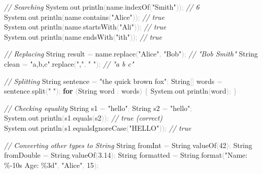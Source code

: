 \documentclass[
  justified,
  openright,
]{tufte-book}
\newcommand{\KeywordTok}[1]{\textcolor{CodeKeyword}{\textbf{#1}}}  %
\newcommand{\StringTok}[1]{\textcolor{CodeString}{#1}}              %
\newcommand{\CommentTok}[1]{\textcolor{CodeComment}{\textit{#1}}}  %
\newcommand{\CodeNumTok}[1]{\textcolor{CodeNumber}{#1}}             %
\newcommand{\CodeFuncTok}[1]{\textcolor{CodeKeyword}{#1}}           %
\newcommand{\OperatorTok}[1]{\textcolor{DarkGray}{#1}}              %
\newenvironment{Shaded}{%
  \begin{mdframed}[style=TufteCode]%
}{%
  \end{mdframed}%
}
\begin{document}
\begin{Shaded}
\begin{Highlighting}[]
\CommentTok{// Searching}
System\OperatorTok{.}\CodeFuncTok{out}\OperatorTok{.}\CodeFuncTok{println}\OperatorTok{(}name\OperatorTok{.}\CodeFuncTok{indexOf}\OperatorTok{(}\StringTok{"Smith"}\OperatorTok{));}   \CommentTok{// 6}
System\OperatorTok{.}\CodeFuncTok{out}\OperatorTok{.}\CodeFuncTok{println}\OperatorTok{(}name\OperatorTok{.}\CodeFuncTok{contains}\OperatorTok{(}\StringTok{"Alice"}\OperatorTok{));}  \CommentTok{// true}
System\OperatorTok{.}\CodeFuncTok{out}\OperatorTok{.}\CodeFuncTok{println}\OperatorTok{(}name\OperatorTok{.}\CodeFuncTok{startsWith}\OperatorTok{(}\StringTok{"Ali"}\OperatorTok{));}  \CommentTok{// true}
System\OperatorTok{.}\CodeFuncTok{out}\OperatorTok{.}\CodeFuncTok{println}\OperatorTok{(}name\OperatorTok{.}\CodeFuncTok{endsWith}\OperatorTok{(}\StringTok{"ith"}\OperatorTok{));}    \CommentTok{// true}
 
\CommentTok{// Replacing}
String result \OperatorTok{=} name\OperatorTok{.}\CodeFuncTok{replace}\OperatorTok{(}\StringTok{"Alice"}\OperatorTok{,} \StringTok{"Bob"}\OperatorTok{);}   \CommentTok{// "Bob Smith"}
String clean \OperatorTok{=} \StringTok{"a,b,c"}\OperatorTok{.}\CodeFuncTok{replace}\OperatorTok{(}\StringTok{","}\OperatorTok{,} \StringTok{" "}\OperatorTok{);}       \CommentTok{// "a b c"}
 
\CommentTok{// Splitting}
String sentence \OperatorTok{=} \StringTok{"the quick brown fox"}\OperatorTok{;}
String\OperatorTok{[]} words \OperatorTok{=} sentence\OperatorTok{.}\CodeFuncTok{split}\OperatorTok{(}\StringTok{" "}\OperatorTok{);}
\KeywordTok{for} \OperatorTok{(}String word \OperatorTok{:} words\OperatorTok{)} \OperatorTok{\{}
    System\OperatorTok{.}\CodeFuncTok{out}\OperatorTok{.}\CodeFuncTok{println}\OperatorTok{(}word\OperatorTok{);}
\OperatorTok{\}}
 
\CommentTok{// Checking equality}
String s1 \OperatorTok{=} \StringTok{"hello"}\OperatorTok{;}
String s2 \OperatorTok{=} \StringTok{"hello"}\OperatorTok{;}
System\OperatorTok{.}\CodeFuncTok{out}\OperatorTok{.}\CodeFuncTok{println}\OperatorTok{(}s1\OperatorTok{.}\CodeFuncTok{equals}\OperatorTok{(}s2\OperatorTok{));}           \CommentTok{// true (correct)}
System\OperatorTok{.}\CodeFuncTok{out}\OperatorTok{.}\CodeFuncTok{println}\OperatorTok{(}s1\OperatorTok{.}\CodeFuncTok{equalsIgnoreCase}\OperatorTok{(}\StringTok{"HELLO"}\OperatorTok{));} \CommentTok{// true}
 
\CommentTok{// Converting other types to String}
String fromInt \OperatorTok{=} String\OperatorTok{.}\CodeFuncTok{valueOf}\OperatorTok{(}\CodeNumTok{42}\OperatorTok{);}
String fromDouble \OperatorTok{=} String\OperatorTok{.}\CodeFuncTok{valueOf}\OperatorTok{(}\CodeNumTok{3.14}\OperatorTok{);}
String formatted \OperatorTok{=} String\OperatorTok{.}\CodeFuncTok{format}\OperatorTok{(}\StringTok{"Name: }\StringTok{\%{-}10s}\StringTok{ Age: }\StringTok{\%3d}\StringTok{"}\OperatorTok{,} \StringTok{"Alice"}\OperatorTok{,} \CodeNumTok{15}\OperatorTok{);}
\end{Highlighting}
\end{Shaded}
\end{document}
